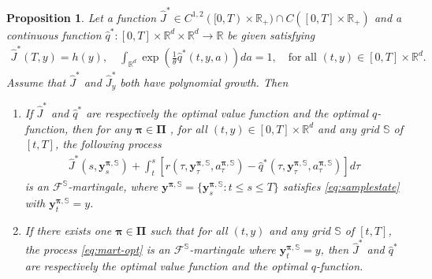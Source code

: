 \documentclass[11pt]{article}
\newtheorem{proposition}{Proposition}
\begin{document}
\begin{proposition}\label{thm:opt-mart}
Let a function $\hat J^* \in C^{1,2}([0,T)\times\mathbb{R}_{+})\cap C([0,T]\times\mathbb{R}_{+})$ and a continuous function $\hat q^*: [0, T] \times \mathbb{R}^d \times \mathbb{R}^d \rightarrow \mathbb{R}$ be given satisfying
\begin{align} \label{eq:boundary}
	\hat J^*(T, y) = h (y), \quad \int_{\mathbb{R}^d } {\exp \left( \frac{1}{\theta} \hat q^*(t,y,a) \right) da} = 1, \quad \text{for all $(t,y) \in [0, T] \times \mathbb{R}^d $}.
\end{align}
Assume that $\hat J^*$ and $\hat J^*_y$ both have polynomial growth.
Then
\begin{enumerate}
	\item [(i)] If $\hat J^*$ and $\hat q^*$ are respectively the optimal value function and the optimal $q$-function,  then for any $\boldsymbol{\pi} \in \boldsymbol{\Pi}$ , for all
	$(t,y) \in [0, T] \times \mathbb{R}^d $ and any grid $\mathbb{S}$ of $[t,T]$, the following process
	\begin{align} \label{eq:mart-opt}
		 \hat J^*(s, \mathbf{y}_s^{ \boldsymbol{\pi}, \mathbb{S}}) +    \int_t^s  [ r(\tau, \mathbf{y}_{\tau}^{\boldsymbol{\pi}, \mathbb{S}}, a_{\tau}^{\boldsymbol{\pi}, \mathbb{S}}) - \hat q^* (\tau, \mathbf{y}_{\tau}^{\boldsymbol{\pi} , \mathbb{S}}, a_{\tau}^{\boldsymbol{\pi}, \mathbb{S}}) ] d\tau
	\end{align}
	is an $\mathcal{F}^{\mathbb{S}}$-martingale, where $\mathbf{y}^{\boldsymbol{\pi}, \mathbb{S}} = \{ \mathbf{y}^{\boldsymbol{\pi}, \mathbb{S}}_s: t \le s \le T\}$ satisfies \eqref{eq:samplestate}  with $\mathbf{y}^{\boldsymbol{\pi}, \mathbb{S}}_t =y$.
	
	
	\item [(ii)] If there exists one $\boldsymbol{\pi} \in \boldsymbol{\Pi}$ such that for all $(t,y)$ and any grid $\mathbb{S}$ of $[t,T]$, the process \eqref{eq:mart-opt} is an $\mathcal{F}^{\mathbb{S}}$-martingale where $\mathbf{y}^{\boldsymbol{\pi}, \mathbb{S}}_t=y$, then $\hat J^*$ and $\hat q^*$ are respectively the optimal value function and the optimal $q$-function.
	
	
\end{enumerate}

\end{proposition}
\end{document}
